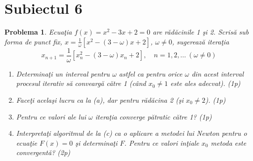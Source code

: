\documentclass[12pt]{article}%
\newtheorem{problem}[theorem]{Problema}
\begin{document}
\section*{Subiectul 6}

\begin{problem}
\label{Gautschip4.41}Ecua\c{t}ia $f(x)=x^{2}-3x+2=0$ are r\u{a}d\u{a}cinile 1
\c{s}i 2. Scris\u{a} sub forma de punct fix, $x=\frac{1}{\omega}\left[
x^{2}-\left(  3-\omega\right)  x+2\right]  $, $\omega\neq0$, sugereaz\u{a}
itera\c{t}ia%
\[
x_{n+1}=\frac{1}{\omega}\left[  x_{n}^{2}-\left(  3-\omega\right)
x_{n}+2\right]  ,\quad n=1,2,\dots~(\omega\neq0)
\]


\begin{enumerate}
\item[(a)] Determina\c{t}i un interval pentru $\omega$ astfel ca pentru orice
$\omega$ din acest interval procesul iterativ s\u{a} convearg\u{a} c\u{a}tre 1
(c\^{a}nd $x_{0}\neq1$ este ales adecvat). (1p)

\item[(b)] Face\c{t}i acela\c{s}i lucru ca la (a), dar pentru r\u{a}d\u{a}cina
2 (\c{s}i $x_{0}\neq2$). (1p)

\item[(c)] Pentru ce valori ale lui $\omega$ itera\c{t}ia converge
p\u{a}tratic c\u{a}tre 1? (1p)

\item[(d)] Interpreta\c{t}i algoritmul de la (c) ca o aplicare a metodei lui
Newton pentru o ecua\c{t}ie $F(x)=0$ \c{s}i determina\c{t}i $F$. Pentru ce
valori in\c{t}iale $x_{0}$ metoda este convergent\u{a}? (2p)
\end{enumerate}
\end{problem}
\end{document}
